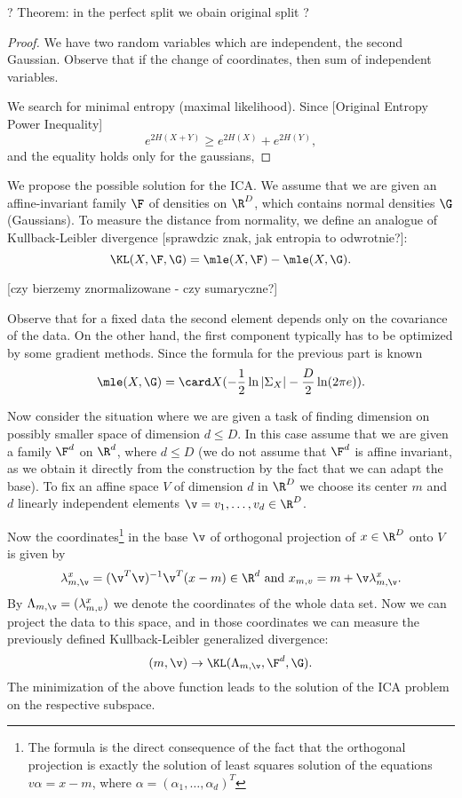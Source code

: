 \begin{theorem}
? Theorem: in the perfect split we obain original split ?
\end{theorem}

\begin{proof}
We have two random variables which are independent, the second Gaussian.
Observe that if the change of coordinates, then sum of independent variables.

We search for minimal entropy (maximal likelihood). Since
[Original Entropy Power Inequality]
$$
e^{2H(X+Y)} \geq e^{2H(X)}+e^{2H(Y)},
$$
and the equality holds only for the gaussians, 
\end{proof}

We propose the possible solution for the ICA. We assume that we are given an affine-invariant family
$\F$ of densities on $\R^D$, which contains normal densities $\G$ (Gaussians). To measure the distance from 
normality, we define an analogue of Kullback-Leibler divergence [sprawdzic znak, jak entropia to odwrotnie?]:
$$
\KL(X,\F,\G)=\mle(X,\F)-\mle(X,\G).
$$

[czy bierzemy znormalizowane - czy sumaryczne?]

Observe that for a fixed data the second element depends only on the covariance of the data. On the other hand, the first component typically has to be optimized by some gradient methods. Since the formula for the previous part is known
$$
\mle(X,\G)=\card X(-\frac{1}{2}\ln |\Sigma_X|-\frac{D}{2}\ln(2\pi e)).
$$

Now consider the situation where we are given a task of finding dimension on possibly smaller space of dimension $d \leq D$.
In this case assume that we are given a family $\F^d$ on $\R^d$, where $d \leq D$ (we do not assume that $\F^d$ is affine invariant, as we obtain it directly from the construction by the fact that we can adapt the base).
To fix an affine space $V$ of dimension $d$ in $\R^D$ we choose its center $m$
and $d$ linearly independent elements $\v=v_1,\ldots,v_d \in \R^D$.

Now the coordinates\footnote{The formula is the direct consequence of the fact that the orthogonal projection is exactly the solution of least squares solution of the equations 
$v \alpha=x-m$, where $\alpha=(\alpha_1,\ldots,\alpha_d)^T$} in the base $\v$ of orthogonal projection of $x \in \R^D$ onto $V$ is given by
\begin{equation} \label{eq:coord}
\lambda_{m,\v}^x=(\v^T\v)^{-1}\v^T(x-m) \in \R^d \text{ and }
x_{m,v}=m+\v\lambda_{m,\v}^x.
\end{equation}
By $\Lambda_{m,\v}=(\lambda^x_{m,v})$ we denote the coordinates of the whole data set.
Now we can project the data to this space, and in those coordinates we can measure
the previously defined Kullback-Leibler generalized divergence:
\begin{equation} \label{eq:KL}
(m,\v) \to \KL(\Lambda_{m,\v},\F^d,\G).
\end{equation}
The minimization of the above function leads to the solution of the ICA
problem on the respective subspace.

